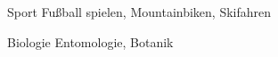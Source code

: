 

\begin{cvpairs}

  
\cvpair
    {Sport} %
    {Fußball spielen, Mountainbiken, Skifahren} %


\cvpair
    {Biologie} %
    {Entomologie, Botanik} %

\end{cvpairs}